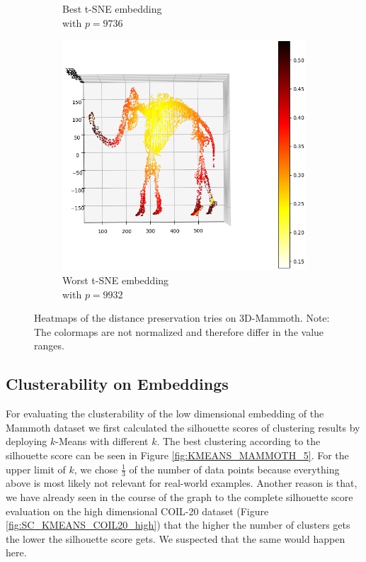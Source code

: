 \begin{figure}[!]
\begin{subfigure}[t]{0.49\columnwidth}
    	\caption{Best t-SNE embedding \\ with $p=9736$}
        \label{fig:reverse_best_tsne_mammoth}
    \end{subfigure}
     \hfill
     \begin{subfigure}[t]{0.49\columnwidth}
    	\centering
    	\includegraphics[width=\columnwidth]{images/reverse_worst_tsne_mammoth.png}
    	\caption{Worst t-SNE embedding \\ with $p=9932$}
        \label{fig:reverse_worst_tsne_mammoth}
    \end{subfigure}
     \caption[Heatmaps of 3D-Mammoth Distance Preservations]{Heatmaps of the distance preservation tries on 3D-Mammoth. Note: The colormaps are not normalized and therefore differ in the value ranges.}
    \label{fig:heat_mamm}
\end{figure}

\subsection{Clusterability on Embeddings} \label{subsec:clu_mamm}

For evaluating the clusterability of the low dimensional embedding of the Mammoth dataset we first calculated the silhouette scores of clustering results by deploying $k$-Means with different $k$. The best clustering according to the silhouette score can be seen in Figure \ref{fig:KMEANS_MAMMOTH_5}. For the upper limit of $k$, we chose $\frac{1}{3}$ of the number of data points because everything above is most likely not relevant for real-world examples. Another reason is that, we have already seen in the course of the graph to the complete silhouette score evaluation on the high dimensional COIL-20 dataset (Figure \ref{fig:SC_KMEANS_COIL20_high}) that the higher the number of clusters gets the lower the silhouette score gets. We suspected that the same would happen here.


